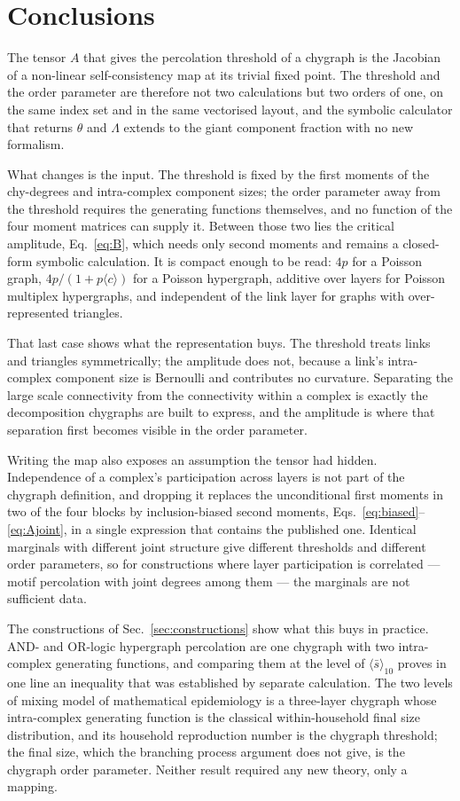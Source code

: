 \documentclass[aps,pre,twocolumn,superscriptaddress,floatfix,longbibliography]{revtex4-2}
\newcommand{\ave}[1]{\langle #1 \rangle}
\begin{document}
\section{Conclusions}

The tensor $A$ that gives the percolation threshold of a chygraph is the
Jacobian of a non-linear self-consistency map at its trivial fixed point. The
threshold and the order parameter are therefore not two calculations but two
orders of one, on the same index set and in the same vectorised layout, and the
symbolic calculator that returns $\theta$ and $\Lambda$ extends to the giant
component fraction with no new formalism.

What changes is the input. The threshold is fixed by the first moments of the
chy-degrees and intra-complex component sizes; the order parameter away from the
threshold requires the generating functions themselves, and no function of the
four moment matrices can supply it. Between those two lies the critical
amplitude, Eq.~\eqref{eq:B}, which needs only second moments and remains a
closed-form symbolic calculation. It is compact enough to be read: $4p$ for a
Poisson graph, $4p/(1+p\ave{c})$ for a Poisson hypergraph, additive over layers
for Poisson multiplex hypergraphs, and independent of the link layer for graphs
with over-represented triangles.

That last case shows what the representation buys. The threshold treats links
and triangles symmetrically; the amplitude does not, because a link's
intra-complex component size is Bernoulli and contributes no curvature.
Separating the large scale connectivity from the connectivity within a complex
is exactly the decomposition chygraphs are built to express, and the amplitude
is where that separation first becomes visible in the order parameter.

Writing the map also exposes an assumption the tensor had hidden. Independence
of a complex's participation across layers is not part of the chygraph
definition, and dropping it replaces the unconditional first moments in two of
the four blocks by inclusion-biased second moments,
Eqs.~\eqref{eq:biased}--\eqref{eq:Ajoint}, in a single expression that contains
the published one. Identical marginals with different joint structure give
different thresholds and different order parameters, so for constructions where
layer participation is correlated --- motif percolation with joint degrees among
them --- the marginals are not sufficient data.

The constructions of Sec.~\ref{sec:constructions} show what this buys in
practice. AND- and
OR-logic hypergraph percolation are one chygraph with two intra-complex
generating functions, and comparing them at the level of $\ave{\bar s}_{10}$
proves in one line an inequality that was established by separate calculation.
The two levels of mixing model of mathematical epidemiology is a three-layer
chygraph whose intra-complex generating function is the classical
within-household final size distribution, and its household reproduction number
is the chygraph threshold; the final size, which the branching process argument
does not give, is the chygraph order parameter. Neither result required any new
theory, only a mapping.
\end{document}
